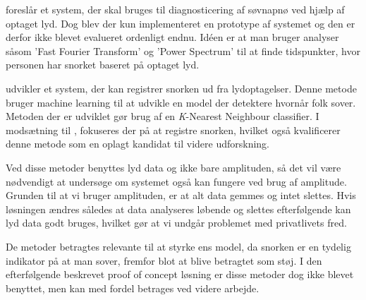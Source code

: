 \citet{Calabrese20111101} foreslår et system, der skal bruges til diagnosticering af søvnapnø ved hjælp af optaget lyd.
Dog blev der kun implementeret en prototype af systemet og den er derfor ikke blevet evalueret ordenligt endnu. 
Idéen er at man bruger analyser såsom 'Fast Fourier Transform' og 'Power Spectrum' til at finde tidspunkter, hvor personen har snorket baseret på optaget lyd. 

\citet{7051338} udvikler et system, der kan registrer snorken ud fra lydoptagelser.
Denne metode bruger machine learning til at udvikle en model der detektere hvornår folk sover.
Metoden der er udviklet gør brug af en \textit{K}-Nearest Neighbour classifier.
I modsætning til \citet{Calabrese20111101}, fokuseres der på at registre snorken, hvilket også kvalificerer denne metode som en oplagt kandidat til videre udforskning.

Ved disse metoder benyttes lyd data og ikke bare amplituden, så det vil være nødvendigt at undersøge om systemet også kan fungere ved brug af amplitude.
Grunden til at vi bruger amplituden, er at alt data gemmes og intet slettes. 
Hvis løsningen ændres således at data analyseres løbende og slettes efterfølgende kan lyd data godt bruges, hvilket gør at vi undgår problemet med privatlivets fred.

De metoder betragtes relevante til at styrke ens model, da snorken er en tydelig indikator på at man sover, fremfor blot at blive betragtet som støj.
I den efterfølgende beskrevet proof of concept løsning er disse metoder dog ikke blevet benyttet, men kan med fordel betrages ved videre arbejde.